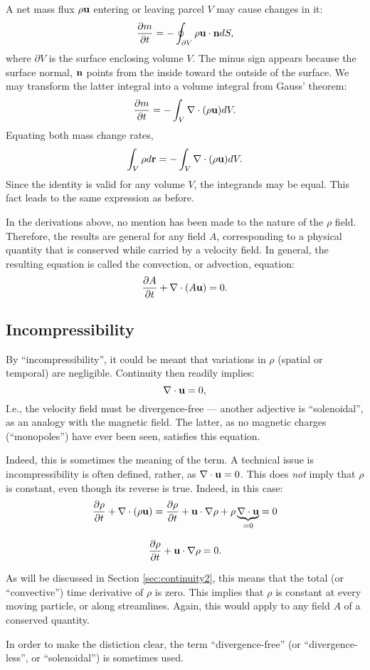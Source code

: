 A net mass flux $\rho\mathbf{u}$  entering or leaving parcel $V$ may cause changes in it:
\[
\frac{\partial m}{\partial t} =
- \oint_{\partial V} \rho \mathbf{u} \cdot \mathbf{n} dS ,
\]
where $\partial V$ is the surface enclosing volume $V$. The minus sign
appears because the surface normal, $\mathbf{n}$ points from the inside
toward the outside of the surface. We may transform the latter
integral into a volume integral from Gauss' theorem:
\[
\frac{\partial m}{\partial t} =
- \int_V \nabla\cdot (\rho \mathbf{u} ) dV .
\]
Equating both mass change rates,
\[
\int_V \rho d\mathbf{r} = - \int_V \nabla\cdot (\rho \mathbf{u} ) dV .
\]
Since the identity is valid for any volume $V$, the integrands may
be equal. This fact leads to the same expression as before.

In the derivations above, no mention has been made to the nature of
the $\rho$ field. Therefore, the results are general for any field $A$,
corresponding to a physical quantity that is conserved while carried
by a velocity field. In general,
the resulting equation is called the convection, or advection,
equation:
\begin{equation}
	\label{eq:convection}
	\frac{\partial A }{\partial t} +  \nabla \cdot (A \mathbf{u} ) = 0 .
\end{equation}



\subsection{Incompressibility}
\label{sec:incompressibility}

By ``incompressibility'', it could be meant
that variations in $\rho$ (spatial or temporal) are
negligible. Continuity then readily implies:
\[
\nabla \cdot  \mathbf{u}  = 0 ,
\]
I.e., the velocity field must be divergence-free --- another adjective
is ``solenoidal'', as an analogy with the magnetic field. The latter,
as no magnetic charges (``monopoles'') have ever been seen, satisfies
this equation.

Indeed, this is sometimes the meaning of the term.  A technical issue
is incompressibility is often defined, rather, as
$\nabla \cdot \mathbf{u} = 0 $. This does \emph{not} imply that $\rho$ is
constant, even though its reverse is true. Indeed, in this case:
\[
\frac{\partial \rho }{\partial t} +  \nabla \cdot (\rho \mathbf{u} ) =
\frac{\partial \rho }{\partial t} +   \mathbf{u} \cdot \nabla \rho
+ \rho \underbrace{\nabla \cdot \mathbf{u}}_{=0} = 0
\]

\begin{equation}\label{eq:continuity_incomp}
	\frac{\partial \rho }{\partial t} +   \mathbf{u} \cdot \nabla \rho = 0 .
\end{equation}

As will be discussed in Section \ref{sec:continuity2}, this means that the
total (or ``convective'') time derivative of $\rho$ is zero. This
implies that $\rho$ is constant at every moving particle, or along
streamlines. Again, this would apply to any field $A$ of a conserved
quantity.

In order to make the distiction clear, the term ``divergence-free'' (or
``divergence-less'', or ``solenoidal'') is sometimes used.
